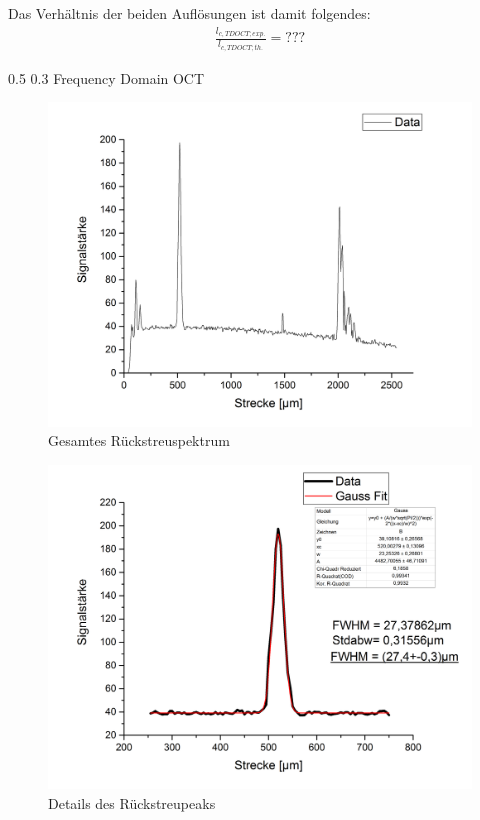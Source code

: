 \documentclass[german, %
parskip=full, %
bibliography=totoc, %
]{scrartcl}
\makeatletter
\renewcommand\subsection{\@startsection 
   {subsection}{2}{0mm}%
   {0.5\baselineskip}%
   {0.3\baselineskip}%
   {\bfseries\sffamily\large}%
   }
\makeatother
\begin{document}
Das Verhältnis der beiden Auflösungen ist damit folgendes:
\begin{align*}
\frac{l_{c, TD OCT; exp.}}{l_{c, TD OCT; th.}} = ???
\end{align*}

\subsection{Frequency Domain OCT}

\begin{figure}[ht]
	\centering
	  \includegraphics[width=\textwidth]{Glasplattenreflex}
  \caption{Gesamtes Rückstreuspektrum}
	\label{fig:Spektrum}
\end{figure}
\begin{figure}[ht]
  \centering
	  \includegraphics[width=\textwidth]{Ergebnis}
	\caption{Details des Rückstreupeaks}
	\label{fig:peak}
\end{figure}
\end{document}
